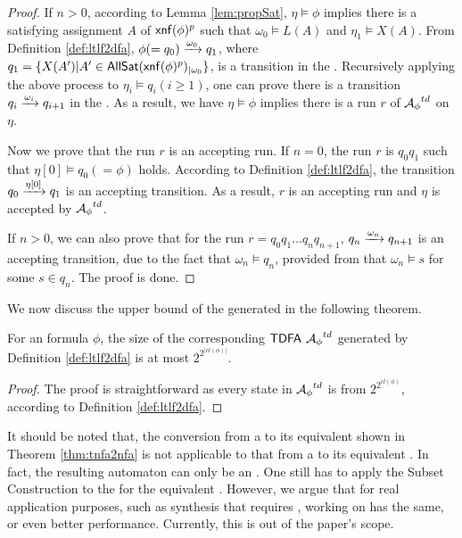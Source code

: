 \begin{proof}
If $n>0$, according to Lemma \ref{lem:propSat}, $\eta\models\phi$ implies there is a satisfying assignment $A$ of ${\sf xnf}(\phi)^p$ such that $\omega_0\models L(A)$ and $\eta_1\models X(A)$. From Definition \ref{def:ltlf2dfa}, $\phi (=q_0)\xrightarrow[]{\omega_0}q_1$, where $q_1=\{X(A') | A'\in{\sf AllSat}({\sf xnf}(\phi)^p)_{|\omega_0}\}$, is a transition in the \TDFA. Recursively applying the above process to $\eta_i\models q_i(i\geq 1)$, one can prove there is a transition $q_i\xrightarrow[]{\omega_i}q_{i+1}$ in the \TDFA. As a result, we have $\eta\models\phi$ implies there is a run $r$ of ${\mathcal{A}_{\phi}}^{td}$ on $\eta$.  

Now we prove that the run $r$ is an accepting run. If $n=0$, the run $r$ is $q_0q_1$ such that $\eta[0]\models q_0(=\phi)$ holds. According to Definition \ref{def:ltlf2dfa}, the transition $q_0\xrightarrow[]{\eta[0]}q_1$ is an accepting transition. As a result, $r$ is an accepting run and $\eta$ is accepted by ${\mathcal{A}_{\phi}}^{td}$.

If $n>0$, we can also prove that for the run $r=q_0q_1\ldots q_n q_{n+1}$, $q_n\xrightarrow[]{\omega_n}q_{n+1}$ is an accepting transition, due to the fact that $\omega_n\models q_n$, provided from that $\omega_n\models s$ for some $s\in q_n$. The proof is done. 
\end{proof}

We now discuss the upper bound of the generated \TDFA in the following theorem.

\begin{theorem}\label{thm:tdfaBound}
For an \ltlf formula $\phi$, the size of the corresponding ${\sf TDFA}$ ${\mathcal{A}_{\phi}}^{td}$ generated by Definition \ref{def:ltlf2dfa} is at most $2^{2^{|cl(\phi)|}}$.
\end{theorem}
\begin{proof}
	The proof is straightforward as every state in ${\mathcal{A}_{\phi}}^{td}$ is from $2^{2^{cl(\phi)}}$, according to Definition \ref{def:ltlf2dfa}.
\end{proof}

It should be noted that, the conversion from a \TNFA to its equivalent \NFA shown in Theorem \ref{thm:tnfa2nfa} is not applicable to that from a \TDFA to its equivalent \DFA. In fact, the resulting automaton can only be an \NFA. One still has to apply the Subset Construction to the \NFA for the equivalent \DFA. However, we argue that for real application purposes, such as \ltlf synthesis that requires \DFA, working on \TDFA has the same, or even better performance. Currently, this is out of the paper's scope.  

